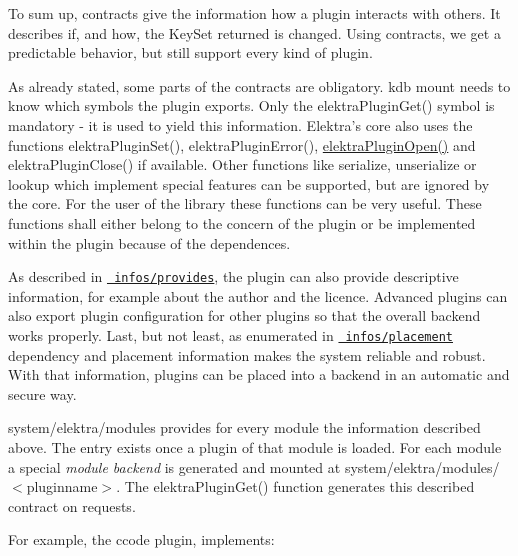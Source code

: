 To sum up, contracts give the information how a plugin interacts with others. It describes if, and how, the {\ttfamily Key\+Set} {\ttfamily returned} is changed. Using contracts, we get a predictable behavior, but still support every kind of plugin.

As already stated, some parts of the contracts are obligatory. {\ttfamily kdb mount} needs to know which symbols the plugin exports. Only the {\ttfamily elektra\+Plugin\+Get()} symbol is mandatory -\/ it is used to yield this information. Elektra’s core also uses the functions {\ttfamily elektra\+Plugin\+Set()}, {\ttfamily elektra\+Plugin\+Error()}, {\ttfamily \mbox{\hyperlink{elektra_2plugin_8c_a32a70a7876542c51d153164ac5108a57}{elektra\+Plugin\+Open()}}} and {\ttfamily elektra\+Plugin\+Close()} if available. Other functions like {\ttfamily serialize}, {\ttfamily unserialize} or {\ttfamily lookup} which implement special features can be supported, but are ignored by the core. For the user of the library these functions can be very useful. These functions shall either belong to the concern of the plugin or be implemented within the plugin because of the dependences.

As described in \href{/home/mpranj/workspace/libelektra/doc/CONTRACT.ini}{\texttt{ infos/provides}}, the plugin can also provide descriptive information, for example about the author and the licence. Advanced plugins can also export plugin configuration for other plugins so that the overall backend works properly. Last, but not least, as enumerated in \href{/home/mpranj/workspace/libelektra/doc/CONTRACT.ini}{\texttt{ infos/placement}} dependency and placement information makes the system reliable and robust. With that information, plugins can be placed into a backend in an automatic and secure way.

{\ttfamily system/elektra/modules} provides for every module the information described above. The entry exists once a plugin of that module is loaded. For each module a special {\itshape module backend} is generated and mounted at {\ttfamily system/elektra/modules/$<$pluginname$>$}. The {\ttfamily elektra\+Plugin\+Get()} function generates this described contract on requests.

For example, the ccode plugin, implements\+:


